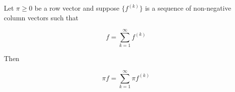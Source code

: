 Let $\pi \geq 0$ be a row vector and suppose $\{f^{(k)}\}$ is a sequence of non-negative column vectors such that

$$f = \sum_{k=1}^{\infty} f^{(k)}$$

Then

$$\pi f = \sum_{k=1}^{\infty} \pi f^{(k)}$$
